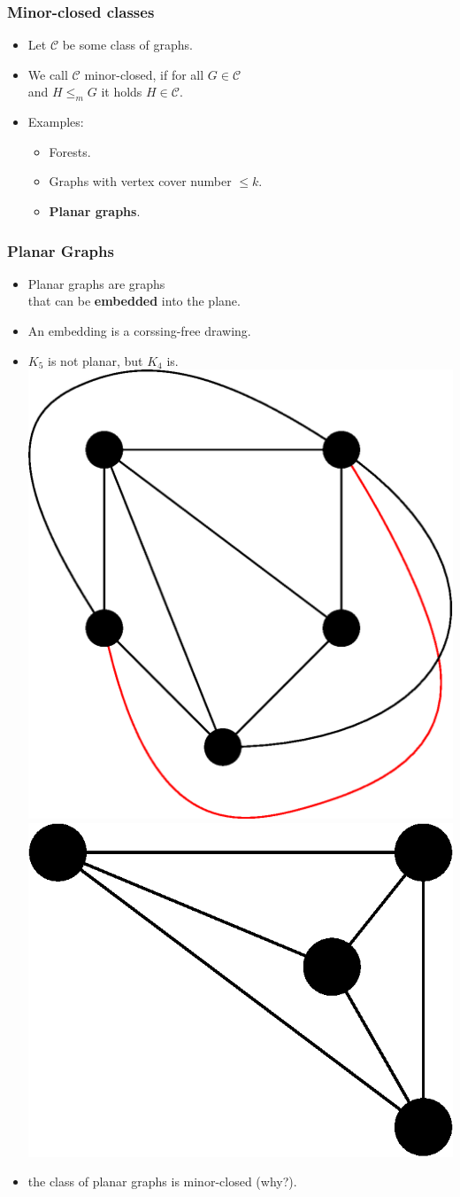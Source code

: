 \documentclass[t,usenames,dvipsnames]{beamer}
\begin{document}
\begin{frame} \frametitle{Minor-closed classes}
	\begin{itemize}[<+->]
		\item Let $\mathcal{C}$ be some class of graphs.
		\item We call $\mathcal{C}$ minor-closed, if for all $G \in
			\mathcal{C}$\\
			\hspace{1cm}and $H\leq_m G$ it holds $H \in \mathcal{C}$.
			\\ \vspace{1cm}
		\item Examples:
			\begin{itemize}
				\item Forests.
				\item Graphs with vertex cover number $\leq k$.
				\item \textbf{Planar graphs}.
			\end{itemize}
	\end{itemize}
\end{frame}
\begin{frame} \frametitle{Planar Graphs}
	\begin{itemize}[<+->]
		\item Planar graphs are graphs\\
			\hspace{1cm}that can be \textbf{embedded} into the plane.
		\item An embedding is a corssing-free drawing.
		\item $K_5$ is not planar, but $K_4$ is.\\
			{
			\includegraphics[width=0.3\linewidth]{k5.eps}
			\hspace{0.2\linewidth}
			\includegraphics[width=0.3\linewidth]{k4.eps}
			}
		\item the class of planar graphs is minor-closed (why?).
	\end{itemize}
\end{frame}
\end{document}

